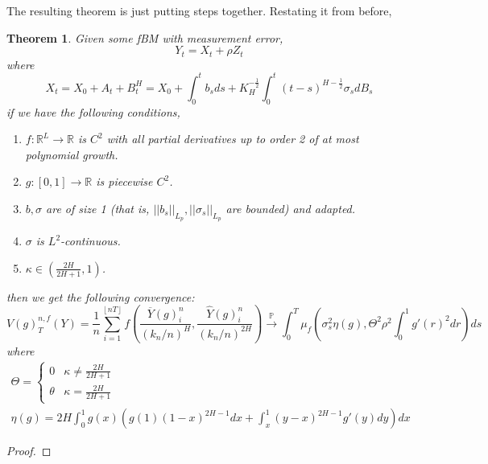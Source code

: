 \documentclass[12pt,letterpaper]{article}
\newtheorem*{theorem}{Theorem}
\theoremstyle{definition}
\newcommand{\R}{\mathbb{R}}
\begin{document}
The resulting theorem is just putting steps together. Restating it from before,
\begin{theorem}
  Given some fBM with measurement error,
  \begin{equation}
    Y_t = X_t + \rho Z_t
  \end{equation}
  where
  \begin{equation}
    X_t = X_0 + A_t + B_t^H = X_0 + \int_0^tb_sds + K_H^{-\frac{1}{2}}\int_0^t(t-s)^{H - \frac{1}{2}}\sigma_sdB_s
  \end{equation}
  if we have the following conditions, %
  \begin{enumerate}
    \item \(f: \R^L \rightarrow \R\) is \(C^2\) with all partial derivatives up to order 2 of at most polynomial growth.
    \item \(g: [0,1] \rightarrow \R\) is piecewise \(C^2\).
    \item \(b, \sigma\) are of size 1 (that is, \(||b_s||_{L_p}, ||\sigma_s||_{L_p}\) are bounded) and adapted.
    \item \(\sigma\) is \(L^2\)-continuous.
    \item \(\kappa \in \left(\frac{2H}{2H+1}, 1\right)\).
  \end{enumerate}
  then we get the following convergence:
  \begin{equation}
    V(g)^{n,f}_T(Y) = \frac{1}{n}\sum_{i=1}^{\left\lfloor nT \right\rfloor}f\left( \frac{\overline{Y}(g)^n_i}{\left( k_n/n \right)^H}, \frac{\widehat{Y}(g)^n_i}{\left( k_n/n \right)^{2H}} \right) \overset{\mathbb{P}}{\rightarrow} \int_0^T \mu_f\left( \sigma_s^2\eta\left( g \right), \Theta^2\rho^2 \int_0^1g'(r)^2dr \right)ds
  \end{equation}
  where
  \begin{gather}
    \Theta =
    \begin{cases}
      0 & \kappa \neq \frac{2H}{2H+1} \\
      \theta &  \kappa = \frac{2H}{2H+1}
    \end{cases} \\
    \eta(g) = 2H\int_0^1g(x)\left(g(1)(1-x)^{2H-1}dx + \int_x^1(y-x)^{2H-1}g'(y)dy\right)dx
  \end{gather}
\end{theorem}

\begin{proof}

\end{proof}
\end{document}
